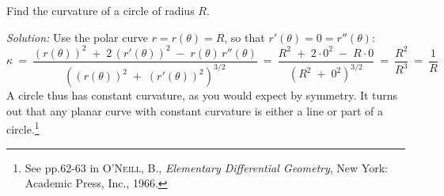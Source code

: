 \begin{exmp}
\noindent Find the curvature of a circle of radius $R$.\vspace{1mm}
\par\noindent\emph{Solution:} Use the polar curve $r=r(\theta)=R$, so that
$r'(\theta) = 0 = r''(\theta)$:
\[
\kappa ~=~ \frac{(r(\theta))^2 \;+\; 2\,(r'(\theta))^2 \;-\;
           r(\theta)\,r''(\theta)}{\left((r(\theta))^2 \;+\; (r'(\theta))^2\right)^{3/2}}
~=~ \frac{R^2 \;+\; 2 \cdot 0^2 \;-\; R \cdot 0}{(R^2 \;+\; 0^2)^{3/2}} ~=~
\frac{R^2}{R^3} ~=~ \frac{1}{R}
\]
A circle thus has constant curvature, as you would expect by symmetry. It turns
out that any planar curve with constant curvature is either a line or part of a
circle.\footnote{See pp.62-63 in \textsc{O'Neill, B.}, \emph{Elementary
Differential Geometry}, New York: Academic Press, Inc., 1966.}
\end{exmp}
\divider
\newpage
\startexercises\label{sec8dot3}
